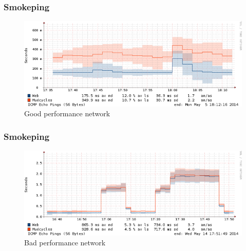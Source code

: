 \begin{frame}
	\frametitle{Smokeping}
	\begin{figure}[h!]
		\centering 
			\includegraphics[scale=0.35]{img/smoke_int_good}
			\caption[Smokeping: Ping test to International Servers with good performance]{Good performance network}
	\end{figure}%
\end{frame}
\begin{frame}
	\frametitle{Smokeping}
	\begin{figure}[h!] 
		\centering 
		\includegraphics[scale=.35]{img/smoke_int_bad}
		\caption[Smokeping: Ping test to International servers with bad performance]{Bad performance network}
	\end{figure}
\end{frame}




